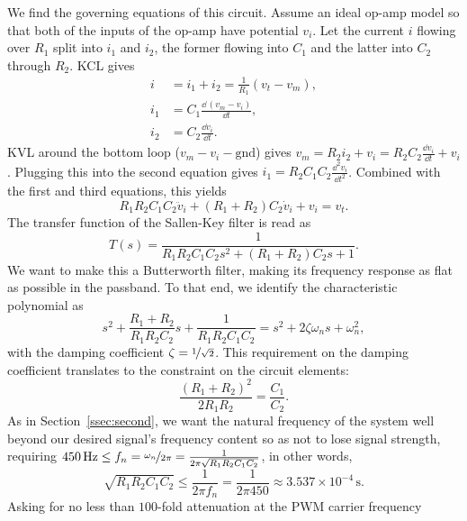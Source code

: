 We find the governing equations of this circuit. Assume an ideal op-amp model so
that both of the inputs of the op-amp have potential $v_i$. Let the current $i$
flowing over $R_{1}$ split into $i_1$ and $i_2$, the former flowing into
$C_{1}$ and the latter into $C_2$ through $R_2$. KCL gives
%
\begin{align*}
    i &= i_1 + i_2 = \frac{1}{R_{1}}(v_t - v_m), \\
    i_1 &= C_{1} \frac{\dd\, (v_m - v_i)}{\dd t}, \\
    i_2 &= C_2 \frac{\dd v_i}{\dd t}.
\end{align*}
%
KVL around the bottom loop ($v_m - v_i - \text{gnd}$) gives $v_m = R_2i_2 +
v_i = R_2C_2\frac{\dd v_i}{\dd t} + v_i$. Plugging this into the second
equation gives $i_1 = R_2C_{1}C_2\frac{\dd^2v_i}{\dd t^2}$. Combined with
the first and third equations, this yields
%
\begin{equation}
    R_{1}R_2C_{1}C_2\ddot{v}_i + (R_{1} + R_2)C_2\dot{v}_i + v_i
    = v_t.
    \label{eq:sallenkey_de}
\end{equation}
%
The transfer function of the Sallen-Key filter is read as
%
\begin{equation}
    T(s) = \frac{1}{R_{1}R_2C_{1}C_2s^2 + (R_{1}+R_2)C_2s + 1}.
    \label{eq:tf_sallenkey}
\end{equation}
%
We want to make this a Butterworth filter, making its frequency response as flat
as possible in the passband. To that end, we identify the characteristic
polynomial as
\[s^2 + \frac{R_1+R_2}{R_1R_2C_2}s + \frac{1}{R_1R_2C_1C_2} = s^2 +
2\zeta\omega_ns + \omega_n^2,\] with the damping coefficient $\zeta =
\nicefrac{1}{\sqrt{2}}$. This requirement on the damping coefficient translates
to the constraint on the circuit elements:
%
\begin{equation}
    \frac{(R_1+R_2)^2}{2R_1R_2} = \frac{C_1}{C_2}. 
    \label{eq:cons1}
\end{equation}
%
As in Section~\ref{ssec:second}, we want the natural frequency of the system
well beyond our desired signal's frequency content so as not to lose signal
strength, requiring $450\,\unit{\hertz} \leq f_n = \nicefrac{\omega_n}{2\pi} =
\frac{1}{2\pi\sqrt{R_1R_2C_1C_2}}$, in other words,
%
\begin{equation}
    \sqrt{R_1R_2C_1C_2} \leq \frac{1}{2\pi f_n} = \frac{1}{2\pi 450} \approx
    3.537 \times 10^{-4}\, \unit{\second}.
    \label{eq:cons2}
\end{equation}
%
Asking for no less than $100$-fold attenuation at the PWM carrier frequency
